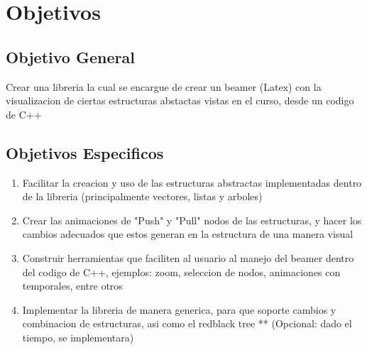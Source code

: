 \documentclass[]{article}
\begin{document}
\section{Objetivos}

\subsection{Objetivo General} 

Crear una libreria la cual se encargue de crear un beamer (Latex) con la visualizacion de ciertas estructuras abstactas vistas en el curso, desde un codigo de C++


\subsection{Objetivos Especificos}


\begin{enumerate}
\item Facilitar la creacion y uso de las estructuras abstractas implementadas dentro de la libreria (principalmente vectores, listas y arboles) 
\item Crear las animaciones de "Push" y "Pull" nodos de las estructuras, y hacer los cambios adecuados que estos generan en la estructura de una manera visual
\item Construir herramientas que faciliten al usuario al manejo del beamer dentro del codigo de C++, ejemplos: zoom, seleccion de nodos, animaciones con temporales, entre otros
\item Implementar la libreria de manera generica, para que soporte cambios y combinacion de estructuras, asi como el redblack tree ** (Opcional: dado el tiempo, se implementara)
\end{enumerate}
\end{document}
